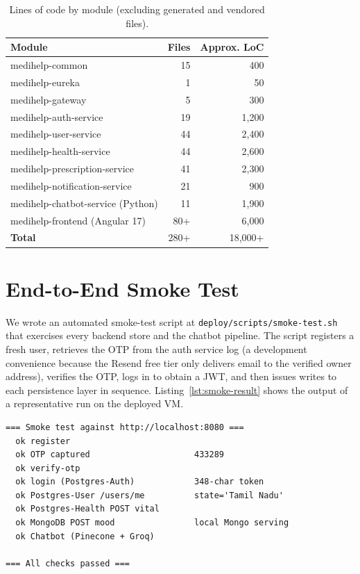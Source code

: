 \documentclass[12pt]{caltech_thesis}
\begin{document}
\begin{table}[H]
    \centering
    \caption{Lines of code by module (excluding generated and vendored files).}
    \label{tab:loc}
    \begin{tabular}{lrr}
        \toprule
        Module                              & Files & Approx. LoC \\
        \midrule
        medihelp-common                     & 15    &   400       \\
        medihelp-eureka                     &  1    &    50       \\
        medihelp-gateway                    &  5    &   300       \\
        medihelp-auth-service               & 19    & 1{,}200     \\
        medihelp-user-service               & 44    & 2{,}400     \\
        medihelp-health-service             & 44    & 2{,}600     \\
        medihelp-prescription-service       & 41    & 2{,}300     \\
        medihelp-notification-service       & 21    &   900       \\
        medihelp-chatbot-service (Python)   & 11    & 1{,}900     \\
        medihelp-frontend (Angular 17)      & 80+   & 6{,}000     \\
        \midrule
        \textbf{Total}                      & 280+  & 18{,}000+   \\
        \bottomrule
    \end{tabular}
\end{table}

\section{End-to-End Smoke Test}
\label{sec:smoke}

We wrote an automated smoke-test script at
\texttt{deploy/scripts/smoke-test.sh} that exercises every backend store
and the chatbot pipeline. The script registers a fresh user, retrieves
the OTP from the auth service log (a development convenience because
the Resend free tier only delivers email to the verified owner address),
verifies the OTP, logs in to obtain a JWT, and then issues writes to
each persistence layer in sequence. Listing~\ref{lst:smoke-result}
shows the output of a representative run on the deployed VM.

\begin{lstlisting}[caption={Smoke test output, deployed VM, 2026-05-10.},
                   label=lst:smoke-result, basicstyle=\ttfamily\footnotesize]
=== Smoke test against http://localhost:8080 ===
  ok register
  ok OTP captured                     433289
  ok verify-otp
  ok login (Postgres-Auth)            348-char token
  ok Postgres-User /users/me          state='Tamil Nadu'
  ok Postgres-Health POST vital
  ok MongoDB POST mood                local Mongo serving
  ok Chatbot (Pinecone + Groq)

=== All checks passed ===
\end{lstlisting}
\end{document}
